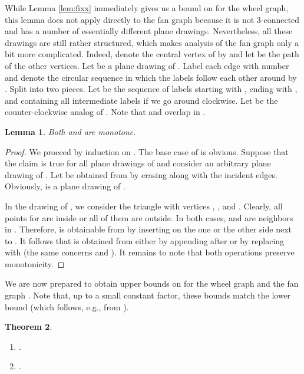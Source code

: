 \documentclass[reqno,12pt]{amsart}
\newtheorem{theorem}{Theorem}[section]
\newtheorem{lemma}[theorem]{Lemma}
\newcounter{claim}
\newenvironment{bfenumerate}{\renewcommand{\labelenumi}{{\bf\theenumi.}}\renewcommand{\labelenumii}{{\bf(\theenumii)}}\begin{enumerate}}{\end{enumerate}}
\begin{document}
While Lemma \ref{lem:fixx} immediately gives us a bound on 
for the wheel graph, this lemma does not apply directly to the fan graph  
because it is not 3-connected and has a number of essentially different plane drawings. 
Nevertheless, all these drawings are still rather structured, which makes
analysis of the fan graph only a bit more complicated.
Indeed, denote the central vertex of  by  and let  
be the path of the other vertices.
Let  be a plane drawing of . Label each edge 
with number  and denote the circular sequence in which the labels follow each other
around  by . Split  into two pieces.
Let  be the sequence of labels starting with , ending with ,
and containing all intermediate labels if we go around  clockwise.
Let  be the counter-clockwise analog of .
Note that  and  overlap in .

\begin{lemma}\label{lem:fans}
Both  and  are monotone.
\end{lemma}

\begin{proof}
We proceed by induction on . The base case of  is obvious.
Suppose that the claim is true for all plane drawings of 
and consider an arbitrary plane drawing  of .
Let  be obtained from  by erasing 
along with the incident edges. Obviously,  is a plane drawing of .

In the drawing  of , we consider the triangle
 with vertices , , and
. Clearly, all points  for  are inside 
or all of them are outside. In both cases,  and  are neighbors in .
Therefore,  is obtainable from  by inserting  on the one
or the other side next to . It follows that  is obtained from
 either by appending  after  or by replacing  with 
(the same concerns  and ). It remains to note that
both operations preserve monotonicity.
\end{proof}

We are now prepared to obtain upper bounds on  for the wheel graph  
and the fan graph .
Note that, up to a small constant factor, these bounds
match the lower bound  (which follows, e.g., from
\cite[Theorem 4.1]{RVe}).

\begin{theorem}\label{thm:FIXWnFn}
\mbox{}

\begin{bfenumerate}
\item
.
\item
.
\end{bfenumerate}
\end{theorem}
 
\end{document}
